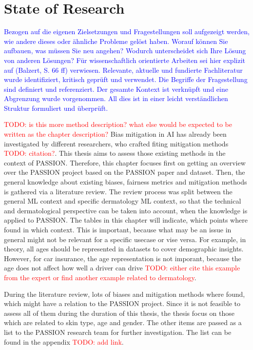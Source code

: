 \documentclass[12pt, a4paper, oneside]{book}   	%
\renewcommand{\todo}[1]{\textcolor{red}{TODO: #1}}
\newcommand{\baaCriteria}[1]{\textcolor{blue}{#1}}
\begin{document}
	\chapter{State of Research}
		\baaCriteria{Bezogen auf die eigenen Zielsetzungen und Fragestellungen soll aufgezeigt werden, wie andere dieses oder ähnliche Probleme gelöst haben. Worauf können Sie aufbauen, was müssen Sie neu angehen?	Wodurch unterscheidet sich Ihre Lösung von anderen Lösungen? Für wissenschaftlich orientierte Arbeiten sei hier explizit auf (Balzert, S. 66 ff) verwiesen.}
		\baaCriteria{Relevante, aktuelle und fundierte Fachliteratur wurde identifiziert, kritisch geprüft und verwendet. Die Begriffe der Fragestellung sind definiert und referenziert. Der gesamte Kontext ist verknüpft und eine Abgrenzung wurde vorgenommen. All dies ist in einer leicht verständlichen Struktur formuliert und überprüft.}
		
		\todo{is this more method description? what else would be expected to be written as the chapter description?}
		Bias mitigation in AI has already been investigated by different researchers, who crafted fiting mitigation methods \todo{citation?}. This thesis aims to assess those existing methods in the context of PASSION. Therefore, this chapter focuses first on getting an overview over the PASSION project based on the PASSION paper and dataset. Then, the general knowledge about existing biases, fairness metrics and mitigation methods is gathered via a literature review. The review process was split between the general ML context and specific dermatology ML context, so that the technical and dermatological perspective can be taken into account, when the knowledge is applied to PASSION. The tables in this chapter will indicate, which points where found in which context. This is important, because what may be an issue in general might not be relevant for a specific usecase or vise versa. For example, in theory, all ages should be represented in datasets to cover demographic insights. However, for car insurance, the age representation is not imporant, because the age does not affect how well a driver can drive \todo{either cite this example from the expert or find another example related to dermatology}.
		
		During the literature review, lots of biases and mitigation methods where found, which might have a relation to the PASSION project. Since it is not feasible to assess all of them during the duration of this thesis, the thesis focus on those which are related to skin type, age and gender. The other items are passed as a list to the PASSION research team for further investigation. The list can be found in the appendix \todo{add link}.
		
\end{document}
